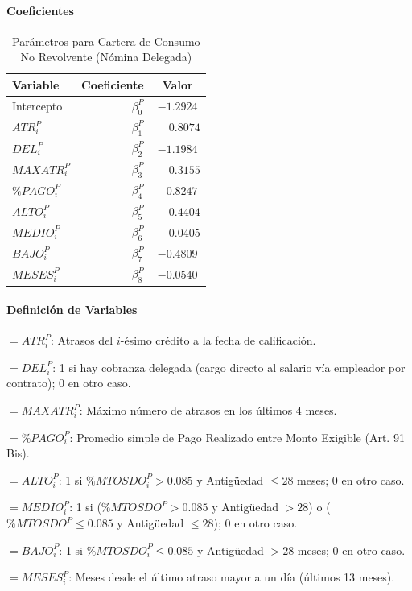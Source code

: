 \paragraph*{Coeficientes}

\begin{table}[h!]
\centering
\small
\begin{tabular}{lrc}
    \toprule
    \textbf{Variable} & \textbf{Coeficiente} & \textbf{Valor} \\
    \midrule
    Intercepto & $\beta_0^P$ & $-1.2924$ \\
    $ATR_i^P$ & $\beta_1^P$ & $\phantom{-}0.8074$ \\
    $DEL_i^P$ & $\beta_2^P$ & $-1.1984$ \\
    $MAXATR_i^P$ & $\beta_3^P$ & $\phantom{-}0.3155$ \\
    $\%PAGO_i^P$ & $\beta_4^P$ & $-0.8247$ \\
    $ALTO_i^P$ & $\beta_5^P$ & $\phantom{-}0.4404$ \\
    $MEDIO_i^P$ & $\beta_6^P$ & $\phantom{-}0.0405$ \\
    $BAJO_i^P$ & $\beta_7^P$ & $-0.4809$ \\
    $MESES_i^P$ & $\beta_8^P$ & $-0.0540$ \\
    \bottomrule
\end{tabular}
\caption{Parámetros para Cartera de Consumo No Revolvente (Nómina Delegada)}
\end{table}

\paragraph*{Definición de Variables}

\begin{description}[leftmargin=2.5cm, labelwidth=2.3cm]
    \item[$Var_{i1}^P$] $= ATR_i^P$: Atrasos del $i$-ésimo crédito a la fecha de calificación.
    \item[$Var_{i2}^P$] $= DEL_i^P$: 1 si hay cobranza delegada (cargo directo al salario vía empleador por contrato); 0 en otro caso.
    \item[$Var_{i3}^P$] $= MAXATR_i^P$: Máximo número de atrasos en los últimos 4 meses.
    \item[$Var_{i4}^P$] $= \%PAGO_i^P$: Promedio simple de Pago Realizado entre Monto Exigible (Art. 91 Bis).
    \item[$Var_{i5}^P$] $= ALTO_i^P$: 1 si $\%MTOSDO_i^P > 0.085$ y Antigüedad $\leq 28$ meses; 0 en otro caso.
    \item[$Var_{i6}^P$] $= MEDIO_i^P$: 1 si ($\%MTOSDO^P > 0.085$ y Antigüedad $> 28$) o ($\%MTOSDO^P \leq 0.085$ y Antigüedad $\leq 28$); 0 en otro caso.
    \item[$Var_{i7}^P$] $= BAJO_i^P$: 1 si $\%MTOSDO_i^P \leq 0.085$ y Antigüedad $> 28$ meses; 0 en otro caso.
    \item[$Var_{i8}^P$] $= MESES_i^P$: Meses desde el último atraso mayor a un día (últimos 13 meses).
\end{description}